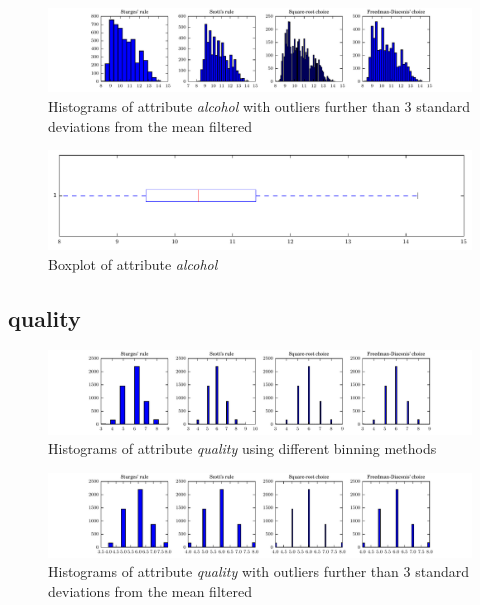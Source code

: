 \documentclass{report}
\begin{document}
\begin{figure}[H]
\includegraphics[width=\textwidth]{histograms/alcohol_filtered.pdf}
\caption{Histograms of attribute \emph{alcohol} with outliers further than 3 standard deviations from the mean filtered}
\end{figure}

\begin{figure}[H]
\includegraphics[width=\textwidth]{boxplots/alcohol.pdf}
\caption{Boxplot of attribute \emph{alcohol}}\end{figure}

\newpage\subsection{quality}
\begin{figure}[H]
\includegraphics[width=\textwidth]{histograms/quality.pdf}
\caption{Histograms of attribute \emph{quality} using different binning methods}\end{figure}

\begin{figure}[H]
\includegraphics[width=\textwidth]{histograms/quality_filtered.pdf}
\caption{Histograms of attribute \emph{quality} with outliers further than 3 standard deviations from the mean filtered}
\end{figure}
\end{document}
